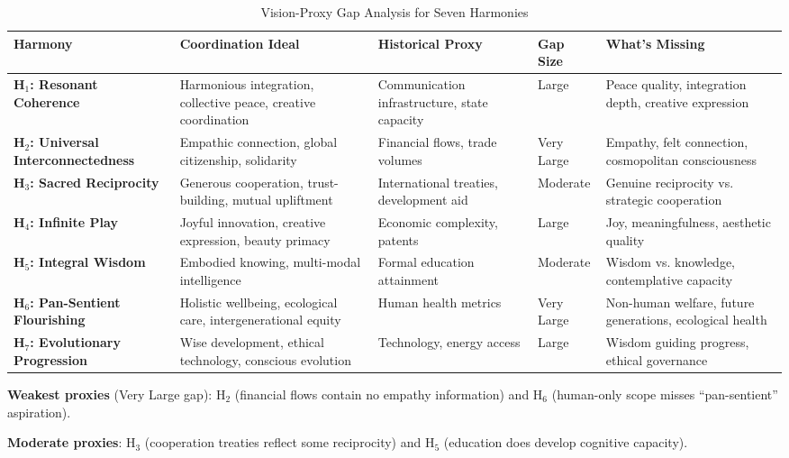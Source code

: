 \documentclass[11pt]{article}
\begin{document}
\begin{table}[h]
\centering
\small
\caption{Vision-Proxy Gap Analysis for Seven Harmonies}
\label{tab:vision-proxy-gap}
\begin{tabular}{p{2.5cm}p{3.5cm}p{3cm}p{1.5cm}p{3cm}}
\toprule
\textbf{Harmony} & \textbf{Coordination Ideal} & \textbf{Historical Proxy} & \textbf{Gap Size} & \textbf{What's Missing} \\
\midrule
\textbf{H$_1$: Resonant Coherence} & Harmonious integration, collective peace, creative coordination & Communication infrastructure, state capacity & Large & Peace quality, integration depth, creative expression \\
\midrule
\textbf{H$_2$: Universal Interconnectedness} & Empathic connection, global citizenship, solidarity & Financial flows, trade volumes & Very Large & Empathy, felt connection, cosmopolitan consciousness \\
\midrule
\textbf{H$_3$: Sacred Reciprocity} & Generous cooperation, trust-building, mutual upliftment & International treaties, development aid & Moderate & Genuine reciprocity vs. strategic cooperation \\
\midrule
\textbf{H$_4$: Infinite Play} & Joyful innovation, creative expression, beauty primacy & Economic complexity, patents & Large & Joy, meaningfulness, aesthetic quality \\
\midrule
\textbf{H$_5$: Integral Wisdom} & Embodied knowing, multi-modal intelligence & Formal education attainment & Moderate & Wisdom vs. knowledge, contemplative capacity \\
\midrule
\textbf{H$_6$: Pan-Sentient Flourishing} & Holistic wellbeing, ecological care, intergenerational equity & Human health metrics & Very Large & Non-human welfare, future generations, ecological health \\
\midrule
\textbf{H$_7$: Evolutionary Progression} & Wise development, ethical technology, conscious evolution & Technology, energy access & Large & Wisdom guiding progress, ethical governance \\
\bottomrule
\end{tabular}
\end{table}

\textbf{Weakest proxies} (Very Large gap): H$_2$ (financial flows contain no
empathy information) and H$_6$ (human-only scope misses ``pan-sentient''
aspiration).

\textbf{Moderate proxies}: H$_3$ (cooperation treaties reflect some reciprocity)
and H$_5$ (education does develop cognitive capacity).
\end{document}
